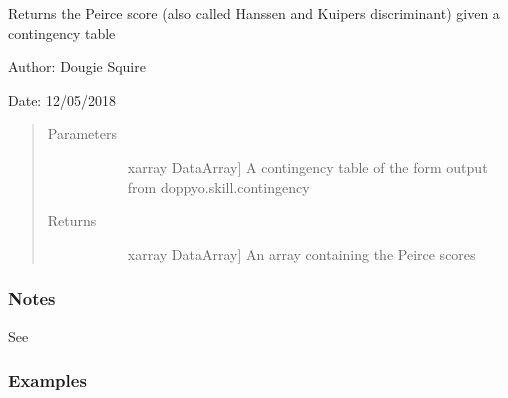 \documentclass[letterpaper,10pt,english]{sphinxmanual}
\begin{document}

\begin{fulllineitems}
\label{\detokenize{skill_doc:skill.Peirce_score}}
Returns the Peirce score (also called Hanssen and Kuipers discriminant) given a contingency                 table

\begin{DUlineblock}{0em}
\item[] Author: Dougie Squire
\item[] Date: 12/05/2018
\end{DUlineblock}
\begin{quote}\begin{description}
\item[{Parameters}] \leavevmode\begin{description}
\item[{}] \leavevmode{[}xarray DataArray{]}
A contingency table of the form output from doppyo.skill.contingency

\end{description}

\item[{Returns}] \leavevmode\begin{description}
\item[{}] \leavevmode{[}xarray DataArray{]}
An array containing the Peirce scores

\end{description}

\end{description}\end{quote}
\subsubsection*{Notes}

See 
\subsubsection*{Examples}


\end{fulllineitems}
\end{document}
